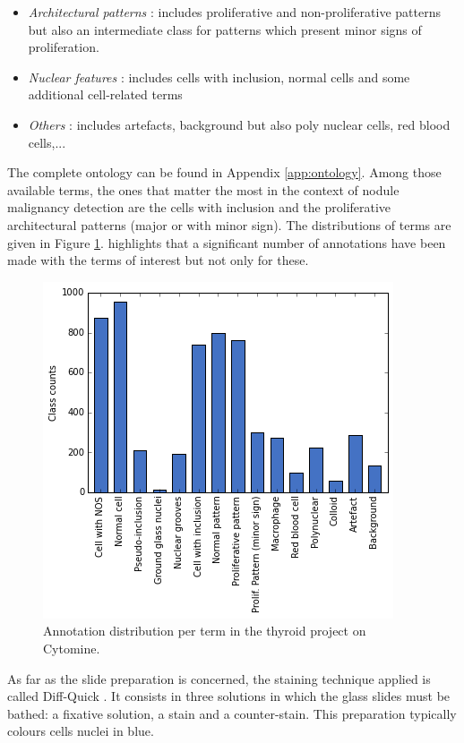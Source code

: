 \begin{itemize}
	\item \textit{Architectural patterns} : includes proliferative and non-proliferative patterns but also an intermediate class for patterns which present minor signs of proliferation.
	\item \textit{Nuclear features} : includes cells with inclusion, normal cells and some additional cell-related terms
	\item \textit{Others} : includes artefacts, background but also poly nuclear cells, red blood cells,...
\end{itemize} 

The complete ontology can be found in Appendix \ref{app:ontology}. Among those available terms, the ones that matter the most in the context of nodule malignancy detection are the cells with inclusion and the proliferative architectural patterns (major or with minor sign). The distributions of terms are given in Figure \ref{fig:ontology_histograms}.   highlights that a significant number of annotations have been made with the terms of interest but not only for these. 

\begin{figure}
	\center
	\includegraphics[scale=0.65]{image/thyroid_annotations.png}
	\caption{Annotation distribution per term in the thyroid project on Cytomine.}
	\label{fig:ontology_histograms}
\end{figure}

As far as the slide preparation is concerned, the staining technique applied is called Diff-Quick \cite{diffquick2016}. It consists in three solutions in which the glass slides must be bathed: a fixative solution, a stain and a counter-stain. This preparation typically colours cells nuclei in blue. 

